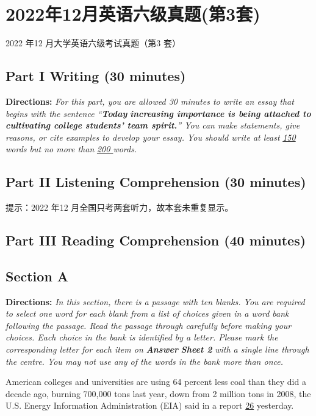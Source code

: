 \documentclass[UTF8,11pt]{ctexart}
\begin{document}
\section*{2022年12月英语六级真题(第3套)}
2022 年12 月大学英语六级考试真题（第3 套）


\subsection*{\textbf{Part I Writing} \textbf{(30 minutes)}}


\textbf{Directions:}\textit{ For this part, you are allowed 30 minutes to write an essay that begins with the sentence “}\textbf{\textit{Today}} \textbf{\textit{increasing importance is being attached to cultivating college students’ team spirit.}}\textit{” You can make statements, give} \textit{reasons, or cite examples to develop your essay. You should write at least }\textit{\uline{150 }}\textit{words but no more than }\textit{\uline{200 }}\textit{words.}


\subsection*{\textbf{Part II} \textbf{Listening Comprehension} \textbf{(30 minutes)}}


提示：2022 年12 月全国只考两套听力，故本套未重复显示。


\subsection*{\textbf{Part III Reading Comprehension (40 minutes)}}


\subsection*{\textbf{Section A}}


\textbf{Directions:} \textit{In this section, there is a passage with ten blanks. You are required to select one word for each blank from} \textit{a list of choices given in a word bank following the passage. Read the passage through carefully before making your} \textit{choices. Each choice in the bank is identified by a letter. Please mark the corresponding letter for each item on }\textbf{\textit{Answer}} \textbf{\textit{Sheet 2}}\textit{ with a single line through the centre. You may not use any of the words in the bank more than once.}


American colleges and universities are using 64 percent less coal than they did a decade ago, burning 700,000 tons last year, down from 2 million tons in 2008, the U.S. Energy Information Administration (EIA) said in a report \uline{26} yesterday.
\end{document}
